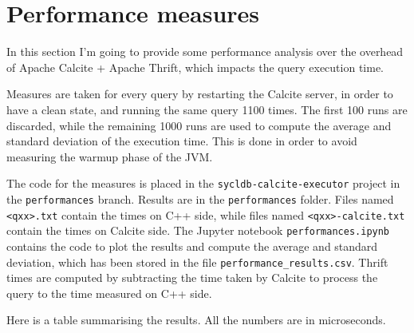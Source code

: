 \documentclass[a4paper, 10pt]{article}
\begin{document}
\section{Performance measures}

In this section I'm going to provide some performance analysis over the overhead of Apache Calcite + Apache Thrift, which impacts the query execution time.

Measures are taken for every query by restarting the Calcite server, in order to have a clean state, and running the same query 1100 times. The first 100 runs are discarded, while the remaining 1000 runs are used to compute the average and standard deviation of the execution time. This is done in order to avoid measuring the warmup phase of the JVM.

The code for the measures is placed in the \texttt{sycldb-calcite-executor} project in the \texttt{performances} branch. Results are in the \texttt{performances} folder. Files named \texttt{<qxx>.txt} contain the times on C++ side, while files named \texttt{<qxx>-calcite.txt} contain the times on Calcite side. The Jupyter notebook \texttt{performances.ipynb} contains the code to plot the results and compute the average and standard deviation, which has been stored in the file \texttt{performance\_results.csv}. Thrift times are computed by subtracting the time taken by Calcite to process the query to the time measured on C++ side.

Here is a table summarising the results. All the numbers are in microseconds.

\end{document}
